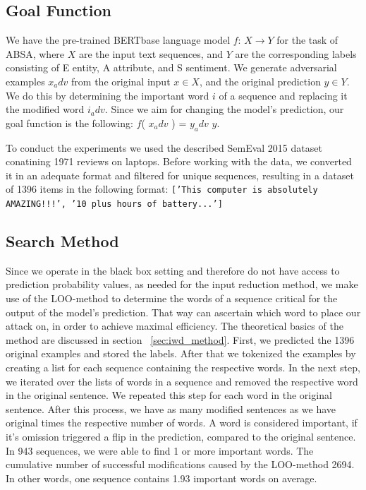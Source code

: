 \subsection{Goal Function}
 \label{sec:goal_function_m}
We have the pre-trained BERTbase language model $f$: ${X \rightarrow Y}$ for the task of ABSA, where $X$ are the input text sequences, and $Y$ are the corresponding labels consisting of E entity, A attribute, and S sentiment. We generate adversarial examples ${x_adv}$ from the original input $x \in X$, and the original prediction $y \in Y$. We do this by determining the important word $i$ of a sequence and replacing it the modified word $i_adv$. Since we aim for changing the model's prediction, our goal function is the following: 
$f$( $x_adv$ ) = $y_adv$ \neq $y$.


To conduct the experiments we used the described SemEval 2015 dataset conatining 1971 reviews on laptops. Before working with the data, we converted it in an adequate format and filtered for unique sequences, resulting in a dataset of 1396 items in the following format:
\texttt{['This computer is absolutely AMAZING!!!', '10 plus hours of battery...']}


\subsection{Search Method}
\label{sec:search_method_m}
Since we operate in the black box setting and therefore do not have access to prediction probability values, as needed for the input reduction method, we make use of the LOO-method to determine the words of a sequence critical for the output of the model's prediction. That way can ascertain which word to place our attack on, in order to achieve maximal efficiency. The theoretical basics of the method are discussed in section ~\ref{sec:iwd_method}.
First, we predicted the 1396 original examples and stored the labels. After that we tokenized the examples by creating a list for each sequence containing the respective words. In the next step, we iterated over the lists of words in a sequence and removed the respective word in the original sentence. We repeated this step for each word in the original sentence. 
After this process, we have as many modified sentences as we have original times the respective number of words. A word is considered important, if it's omission triggered a flip in the prediction, compared to the original sentence. 
In 943 sequences, we were able to find 1 or more important words. The cumulative number of successful modifications caused by the LOO-method 2694. In other words, one sequence contains 1.93 important words on average.

